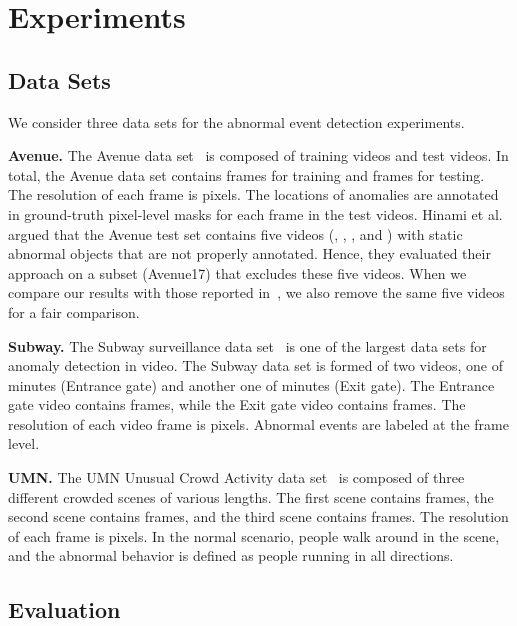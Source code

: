 \documentclass[10pt,twocolumn,letterpaper]{article}
\begin{document}
\vspace*{-0.2cm}
\section{Experiments}
\label{sec_Experiments}

\vspace*{-0.1cm}
\subsection{Data Sets}
\vspace*{-0.1cm}

We consider three data sets for the abnormal event detection experiments.

\noindent
{\bf Avenue.}
The Avenue data set~\cite{Lu-ICCV-2013} is composed of  training videos and  test videos. In total, the Avenue data set contains  frames for training and  frames for testing. The resolution of each frame is  pixels. The locations of anomalies are annotated in ground-truth pixel-level masks for each frame in the test videos. Hinami et al.~\cite{Hinami-ICCV-2017} argued that the Avenue test set contains five videos (, , ,  and ) with static abnormal objects that are not properly annotated. Hence, they evaluated their approach on a subset (Avenue17) that excludes these five videos. When we compare our results with those reported in~\cite{Hinami-ICCV-2017}, we also remove the same five videos for a fair comparison.

\noindent
{\bf Subway.}
The Subway surveillance data set~\cite{Adam-PAMI-2008} is one of the largest data sets for anomaly detection in video. The Subway data set is formed of two videos, one of  minutes (Entrance gate) and another one of  minutes (Exit gate). The Entrance gate video contains  frames, while the Exit gate video contains  frames. The resolution of each video frame is  pixels. Abnormal events are labeled at the frame level. 

\noindent
{\bf UMN.}
The UMN Unusual Crowd Activity data set~\cite{Mehran-CVPR-2009} is composed of three different crowded scenes of various lengths. The first scene contains  frames, the second scene contains  frames, and the third scene contains  frames. The resolution of each frame is  pixels. In the normal scenario, people walk around in the scene, and the abnormal behavior is defined as people running in all directions.

\vspace*{-0.1cm}
\subsection{Evaluation}
\vspace*{-0.1cm}
\end{document}
